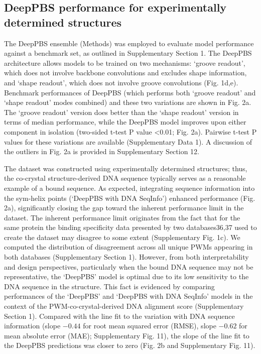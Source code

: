 \subsection{DeepPBS performance for experimentally determined structures}
The DeepPBS ensemble (Methods) was employed to evaluate model performance against a benchmark set, as outlined in Supplementary Section 1. The DeepPBS architecture allows models to be trained on two mechanisms: ‘groove readout’, which does not involve backbone convolutions and excludes shape information, and ‘shape readout’, which does not involve groove convolutions (Fig. 1d,e). Benchmark performances of DeepPBS (which performs both ‘groove readout’ and ‘shape readout’ modes combined) and these two variations are shown in Fig. 2a. The ‘groove readout’ version does better than the ‘shape readout’ version in terms of median performance, while the DeepPBS model improves upon either component in isolation (two-sided t-test P value <0.01; Fig. 2a). Pairwise t-test P values for these variations are available (Supplementary Data 1). A discussion of the outliers in Fig. 2a is provided in Supplementary Section 12.
\par
The dataset was constructed using experimentally determined structures; thus, the co-crystal structure-derived DNA sequence typically serves as a reasonable example of a bound sequence. As expected, integrating sequence information into the sym-helix points (‘DeepPBS with DNA SeqInfo’) enhanced performance (Fig. 2a), significantly closing the gap toward the inherent performance limit in the dataset. The inherent performance limit originates from the fact that for the same protein the binding specificity data presented by two databases36,37 used to create the dataset may disagree to some extent (Supplementary Fig. 1c). We computed the distribution of disagreement across all unique PWMs appearing in both databases (Supplementary Section 1). However, from both interpretability and design perspectives, particularly when the bound DNA sequence may not be representative, the ‘DeepPBS’ model is optimal due to its low sensitivity to the DNA sequence in the structure. This fact is evidenced by comparing performances of the ‘DeepPBS’ and ‘DeepPBS with DNA SeqInfo’ models in the context of the PWM-co-crystal-derived DNA alignment score (Supplementary Section 1). Compared with the line fit to the variation with DNA sequence information (slope $-0.44$ for root mean squared error (RMSE), slope $-0.62$ for mean absolute error (MAE); Supplementary Fig. 11), the slope of the line fit to the DeepPBS predictions was closer to zero (Fig. 2b and Supplementary Fig. 11).

